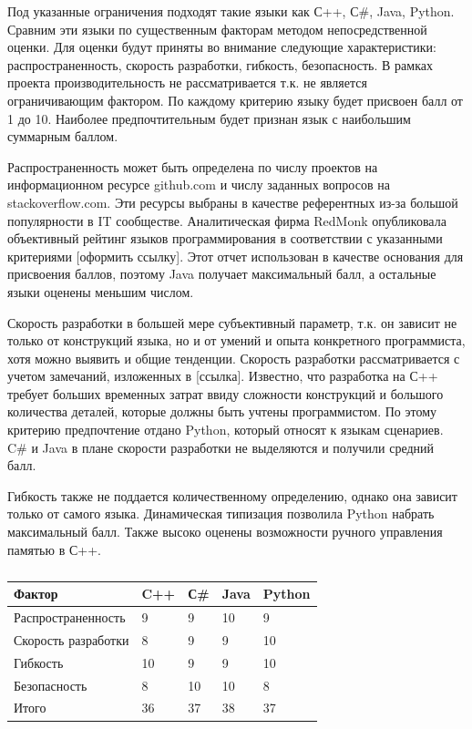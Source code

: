 \documentclass[14pt,oneside,final]{extreport}
\begin{document}
	Под указанные ограничения подходят такие языки как С++, С\#, Java, Python. Сравним эти языки по существенным факторам методом непосредственной оценки. Для оценки будут приняты во внимание следующие характеристики: распространенность, скорость разработки, гибкость, безопасность. В рамках проекта производительность не рассматривается т.к. не является ограничивающим фактором. По каждому критерию языку будет присвоен балл от 1 до 10. Наиболее предпочтительным будет признан язык с наибольшим суммарным баллом. 
	
	Распространенность может быть определена по числу проектов на информационном ресурсе github.com и числу заданных вопросов на stackoverflow.com. Эти ресурсы выбраны в качестве референтных из-за большой популярности в IT сообществе. Аналитическая фирма RedMonk опубликовала объективный рейтинг языков программирования в соответствии с указанными критериями [оформить ссылку]. Этот отчет использован в качестве основания для присвоения баллов, поэтому Java получает максимальный балл, а остальные языки оценены меньшим числом. 
	
	Скорость разработки в большей мере субъективный параметр, т.к. он зависит не только от конструкций языка, но и от умений и опыта конкретного программиста, хотя можно выявить и общие тенденции. Скорость разработки рассматривается с учетом замечаний, изложенных в [ссылка]. Известно, что разработка на С++ требует больших временных затрат ввиду сложности конструкций и большого количества деталей, которые должны быть учтены программистом. По этому критерию предпочтение отдано Python, который относят к языкам сценариев. C\# и Java в плане скорости разработки не выделяются и получили средний балл.
	
	Гибкость также не поддается количественному определению, однако она зависит только от самого языка. Динамическая типизация позволила Python набрать максимальный балл. Также высоко оценены возможности ручного управления памятью в С++.
   
	\begin{table}[htb]
	\centering
	\caption{}\label{tab:1} 
	\begin{tabularx}{\textwidth}{|l|Z|Z|Z|Z|}

		\hline Фактор & C++ & С\# & Java & Python \\ 
		\hline Распространенность & 9 & 9 & 10 & 9 \\ 
		\hline Скорость разработки & 8 & 9 & 9 & 10 \\ 
		\hline Гибкость & 10 & 9 & 9 & 10 \\ 
		\hline Безопасность & 8 & 10 & 10 & 8 \\ 
		\hline Итого & 36 & 37 & 38 & 37 \\ 
		\hline 
	\end{tabularx}
	\end{table}
	
\end{document}
